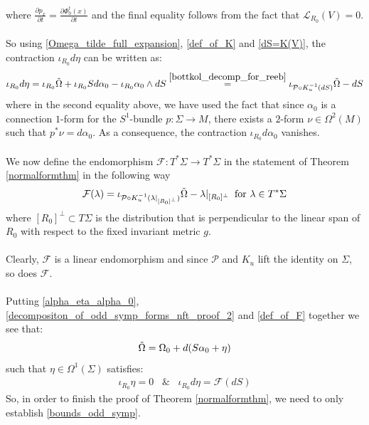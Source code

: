\documentclass[11pt]{amsart}
\theoremstyle{plain}
\theoremstyle{definition}
\theoremstyle{remark}
\begin{document}
where $\frac{ \partial p_x}{\partial t} = \frac{ \partial \Phi^t_0(x)}{\partial t}$ and the final equality follows from the fact that $\mathcal{L}_{R_0}(V) =0$.\\
\\
So using \eqref{Omega_tilde_full_expansion}, \eqref{def_of_K} and \eqref{dS=K(V)}, the contraction $\iota_{R_{0}} d\eta$ can be written as:
\begin{align}\label{decompositon_of_odd_symp_forms_nft_proof_2}
    \iota_{R_{0}} d\eta = \iota_{R_0} \tilde{\Omega} + \iota_{R_0} Sd\alpha_0 -\iota_{R_0} \alpha_0 \wedge dS
   \stackrel{\eqref{bottkol_decomp_for_reeb}}{=} \iota_{\mathcal{P} \circ K_{u}^{-1}(dS)} \tilde{\Omega} - dS
\end{align}
where in the second equality above, we have used the fact that since $\alpha_0$ is a connection $1$-form for the $S^1$-bundle $p: \Sigma \rightarrow M$, there exists a $2$-form $\nu \in \Omega^2(M)$ such that $p^*\nu = d\alpha_0$. As a consequence, the contraction $\iota_{R_0} d\alpha_0$ vanishes. \\
\\
We now define the endomorphism $\mathcal{F}: T^*\Sigma \rightarrow T^*\Sigma$ in the statement of Theorem \ref{normalformthm} in the following way
\begin{align}\label{def_of_F}
    \mathcal{F}(\lambda) = \iota_{\mathcal{P}\circ K^{-1}_u(\lambda|_{[R_0]^{\perp}})} \Tilde{\Omega} - \lambda|_{[R_0]^{\perp}} \;\; \text{for $\lambda \in T^*\Sigma$}
\end{align}
where $[R_0]^{\perp} \subset T\Sigma$ is the distribution that is perpendicular to the linear span of $R_0$ with respect to the fixed invariant metric $g$.\\
\\
Clearly, $\mathcal{F}$ is a linear endomorphism and since $\mathcal{P}$ and $K_u$ lift the identity on $\Sigma$, so does $\mathcal{F}$.\\
\\
Putting \eqref{alpha_eta_alpha_0}, \eqref{decompositon_of_odd_symp_forms_nft_proof_2} and \eqref{def_of_F} together we see that:
\begin{align}\label{tilda_omega_final_form}
    \Tilde{\Omega} = \Omega_0 + d(S\alpha_0 + \eta)
\end{align}
such that $\eta \in \Omega^1(\Sigma)$ satisfies:
\begin{align}
  \iota_{R_0} \eta =0 \;\;\; \& \;\;\; \iota_{R_0} d\eta = \mathcal{F}(dS)
\end{align}
So, in order to finish the proof of Theorem \ref{normalformthm}, we need to only establish \eqref{bounds_odd_symp}.\\
\end{document}
